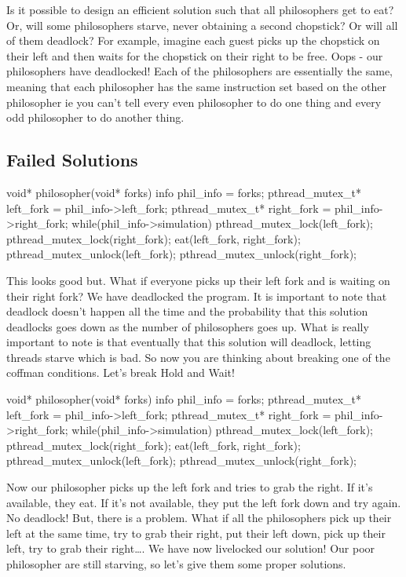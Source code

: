 Is it possible to design an efficient solution such that all philosophers get to eat? Or, will some philosophers starve, never obtaining a second chopstick? Or will all of them deadlock? For example, imagine each guest picks up the chopstick on their left and then waits for the chopstick on their right to be free. Oops - our philosophers have deadlocked! Each of the philosophers are essentially the same, meaning that each philosopher has the same instruction set based on the other philosopher ie you can't tell every even philosopher to do one thing and every odd philosopher to do another thing.

\subsection{Failed Solutions}

\begin{code}[language=C]
void* philosopher(void* forks){
     info phil_info = forks;
     pthread_mutex_t* left_fork = phil_info->left_fork;
     pthread_mutex_t* right_fork = phil_info->right_fork;
     while(phil_info->simulation){
          pthread_mutex_lock(left_fork);
          pthread_mutex_lock(right_fork);
          eat(left_fork, right_fork);
          pthread_mutex_unlock(left_fork);
          pthread_mutex_unlock(right_fork);
     }
}
\end{code}

This looks good but. What if everyone picks up their left fork and is waiting on their right fork? We have deadlocked the program. It is important to note that deadlock doesn't happen all the time and the probability that this solution deadlocks goes down as the number of philosophers goes up. What is really important to note is that eventually that this solution will deadlock, letting threads starve which is bad. So now you are thinking about breaking one of the coffman conditions. Let's break Hold and Wait!

\begin{code}[language=C]
void* philosopher(void* forks){
     info phil_info = forks;
     pthread_mutex_t* left_fork = phil_info->left_fork;
     pthread_mutex_t* right_fork = phil_info->right_fork;
     while(phil_info->simulation){
          pthread_mutex_lock(left_fork);
          pthread_mutex_lock(right_fork);
          eat(left_fork, right_fork);
          pthread_mutex_unlock(left_fork);
          pthread_mutex_unlock(right_fork);
     }
}
\end{code}

Now our philosopher picks up the left fork and tries to grab the right. If it's available, they eat. If it's not available, they put the left fork down and try again. No deadlock! But, there is a problem. What if all the philosophers pick up their left at the same time, try to grab their right, put their left down, pick up their left, try to grab their right\ldots{}. We have now livelocked our solution! Our poor philosopher are still starving, so let's give them some proper solutions.

